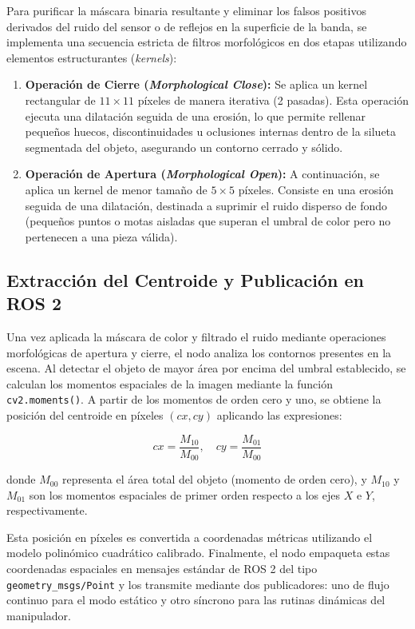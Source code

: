 \documentclass[12pt, a4paper]{report}
\begin{document}
Para purificar la máscara binaria resultante y eliminar los falsos positivos derivados del ruido del sensor o de reflejos en la superficie de la banda, se implementa una secuencia estricta de filtros morfológicos en dos etapas utilizando elementos estructurantes (\textit{kernels}):
\begin{enumerate}
    \item \textbf{Operación de Cierre (\textit{Morphological Close}):} Se aplica un kernel rectangular de $11\times11$ píxeles de manera iterativa (2 pasadas). Esta operación ejecuta una dilatación seguida de una erosión, lo que permite rellenar pequeños huecos, discontinuidades u oclusiones internas dentro de la silueta segmentada del objeto, asegurando un contorno cerrado y sólido.
    \item \textbf{Operación de Apertura (\textit{Morphological Open}):} A continuación, se aplica un kernel de menor tamaño de $5\times5$ píxeles. Consiste en una erosión seguida de una dilatación, destinada a suprimir el ruido disperso de fondo (pequeños puntos o motas aisladas que superan el umbral de color pero no pertenecen a una pieza válida).
\end{enumerate}

\subsection{Extracción del Centroide y Publicación en ROS 2}
Una vez aplicada la máscara de color y filtrado el ruido mediante operaciones morfológicas de apertura y cierre, el nodo analiza los contornos presentes en la escena. Al detectar el objeto de mayor área por encima del umbral establecido, se calculan los momentos espaciales de la imagen mediante la función \texttt{cv2.moments()}. A partir de los momentos de orden cero y uno, se obtiene la posición del centroide en píxeles $(cx, cy)$ aplicando las expresiones:

\begin{equation}
cx = \frac{M_{10}}{M_{00}}, \quad cy = \frac{M_{01}}{M_{00}}
\label{eq:centroide}
\end{equation}

donde $M_{00}$ representa el área total del objeto (momento de orden cero), y $M_{10}$ y $M_{01}$ son los momentos espaciales de primer orden respecto a los ejes $X$ e $Y$, respectivamente.

Esta posición en píxeles es convertida a coordenadas métricas utilizando el modelo polinómico cuadrático calibrado. Finalmente, el nodo empaqueta estas coordenadas espaciales en mensajes estándar de ROS 2 del tipo \texttt{geometry\_msgs/Point} y los transmite mediante dos publicadores: uno de flujo continuo para el modo estático y otro síncrono para las rutinas dinámicas del manipulador.
\end{document}
